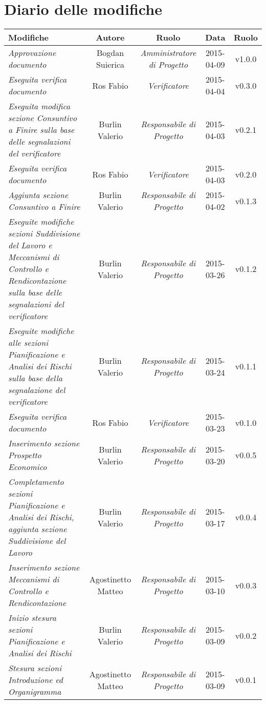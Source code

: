 \newpage
\section*{Diario delle modifiche}

\begin{table}[h]
\centering
\begin{tabular}{|p{}|c|c|c|c|}
	\toprule
		\textbf{Modifiche} & \textbf{Autore} & \textbf{Ruolo} & \textbf{Data} & \textbf{Ruolo} \\
	\midrule
	\midrule
		\textit{Approvazione documento} & Bogdan Suierica & \textit{Amministratore di Progetto} & 2015-04-09 & v1.0.0 \\
	\midrule
		\textit{Eseguita verifica documento} & Ros Fabio & \textit{Verificatore} & 2015-04-04 & v0.3.0 \\
	\midrule
		\textit{Eseguita modifica sezione Consuntivo a Finire sulla base delle segnalazioni del verificatore} & Burlin Valerio & \textit{Responsabile di Progetto} & 2015-04-03 & v0.2.1 \\
	\midrule
		\textit{Eseguita verifica documento} & Ros Fabio & \textit{Verificatore} & 2015-04-03 & v0.2.0 \\
    \midrule
	    \textit{Aggiunta sezione Consuntivo a Finire} & Burlin Valerio & \textit{Responsabile di Progetto} & 2015-04-02 & v0.1.3 \\
	\midrule
		\textit{Eseguite modifiche sezioni Suddivisione del Lavoro e Meccanismi di Controllo e Rendicontazione sulla base delle segnalazioni del verificatore} & Burlin Valerio & \textit{Responsabile di Progetto} & 2015-03-26 & v0.1.2 \\
	\midrule
		\textit{Eseguite modifiche alle sezioni Pianificazione e Analisi dei Rischi sulla base della segnalazione del verificatore} & Burlin Valerio & \textit{Responsabile di Progetto} & 2015-03-24 & v0.1.1 \\
	\midrule
		\textit{Eseguita verifica documento} & Ros Fabio & \textit{Verificatore} & 2015-03-23 & v0.1.0 \\
	\midrule
		\textit{Inserimento sezione Prospetto Economico} & Burlin Valerio & \textit{Responsabile di Progetto} & 2015-03-20 & v0.0.5 \\
	\midrule
		\textit{Completamento sezioni Pianificazione e Analisi dei Rischi, aggiunta sezione Suddivisione del Lavoro} & Burlin Valerio & \textit{Responsabile di Progetto} & 2015-03-17 & v0.0.4 \\
	\midrule
	    \textit{Inserimento sezione Meccanismi di Controllo e Rendicontazione} & Agostinetto Matteo & \textit{Responsabile di Progetto} & 2015-03-10 & v0.0.3 \\
	\midrule
		\textit{Inizio stesura sezioni Pianificazione e Analisi dei Rischi} & Burlin Valerio & \textit{Responsabile di Progetto} & 2015-03-09 & v0.0.2 \\	                         
	\midrule
		\textit{Stesura sezioni Introduzione ed Organigramma} & Agostinetto Matteo & \textit{Responsabile di Progetto} & 2015-03-09 & v0.0.1 \\
	\bottomrule
\end{tabular}	
\end{table}

\newpage
